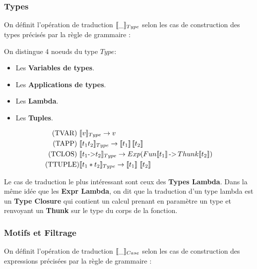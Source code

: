 \documentclass[12pt]{article}
\begin{document}
\subsubsection*{Types}\label{types-2}

On définit l'opération de traduction \(\llbracket \_ \rrbracket_{Type}\) selon les cas de construction
des types précisés par la règle de grammaire : 


On distingue 4 noeuds du type $Type$:
\begin{itemize}
      \tightlist
      \item
            Les \textbf{Variables de types}.
      \item
            Les \textbf{Applications de types}.
      \item
            Les \textbf{Lambda}.
      \item
            Les \textbf{Tuples}.
\end{itemize}
\begin{align*}
      \text{(TVAR) }  & \llbracket v \rrbracket_{Type} \rightarrow  v                                                                                          \\
      \text{(TAPP) }  & \llbracket t_1 t_2 \rrbracket_{Type} \rightarrow  \llbracket t_1 \rrbracket \, \llbracket t_2 \rrbracket                                       \\
      \text{(TCLOS) } & \llbracket t_1 \text{->} t_2 \rrbracket_{Type} \rightarrow  Exp (Fun\llbracket t_1 \rrbracket \, \text{->} \, Thunk\llbracket t_2 \rrbracket ) \\
      \text{(TTUPLE)} & \llbracket t_1 * t_2 \rrbracket_{Type} \rightarrow  \llbracket t_1 \rrbracket \,  \, \llbracket t_2 \rrbracket
\end{align*}

Le cas de traduction le plus intéressant sont ceux des \textbf{Types Lambda}.
Dans la même idée que les \textbf{Expr Lambda}, on dit que la traduction d'un type lambda est un \textbf{Type Closure} qui contient un calcul prenant en paramètre un type et renvoyant un \textbf{Thunk} sur le type du corps de la fonction.

\subsubsection*{Motifs et Filtrage}\label{motifs-et-filtrage}

On définit l'opération de traduction \(\llbracket \_ \rrbracket_{Case}\) selon les cas de construction
des expressions précisées par la règle de grammaire : 
\end{document}
